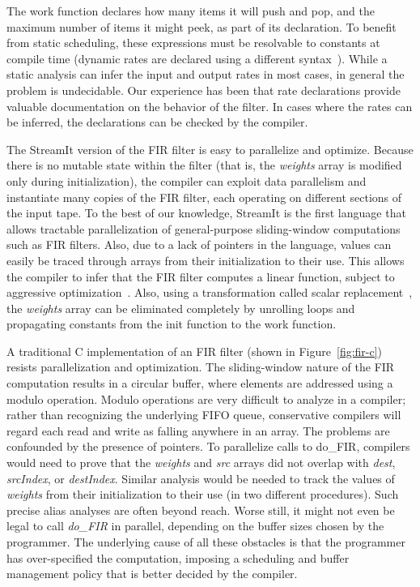 The work function declares how many items it will push and pop, and
the maximum number of items it might peek, as part of its declaration.
To benefit from static scheduling, these expressions must be
resolvable to constants at compile time (dynamic rates are declared
using a different syntax~\cite{streamit-lang-spec}). While a static
analysis can infer the input and output rates in most cases, in
general the problem is undecidable.  Our experience has been that rate
declarations provide valuable documentation on the behavior of the
filter.  In cases where the rates can be inferred, the declarations
can be checked by the compiler.

The StreamIt version of the FIR filter is easy to parallelize and
optimize.  Because there is no mutable state within the filter (that
is, the {\it weights} array is modified only during initialization),
the compiler can exploit data parallelism and instantiate many copies
of the FIR filter, each operating on different sections of the input
tape.  To the best of our knowledge, StreamIt is the first language
that allows tractable parallelization of general-purpose
sliding-window computations such as FIR filters.  Also, due to a lack
of pointers in the language, values can easily be traced through
arrays from their initialization to their use.  This allows the
compiler to infer that the FIR filter computes a linear function,
subject to aggressive optimization~\cite{lamb-pldi03}.  Also,
using a transformation called scalar
replacement~\cite{sermulins:lctes:2005}, the {\it weights} array can
be eliminated completely by unrolling loops and propagating constants
from the init function to the work function.

A traditional C implementation of an FIR filter (shown in
Figure~\ref{fig:fir-c}) resists parallelization and optimization.  The
sliding-window nature of the FIR computation results in a circular
buffer, where elements are addressed using a modulo operation.  Modulo
operations are very difficult to analyze in a compiler; rather than
recognizing the underlying FIFO queue, conservative compilers will
regard each read and write as falling anywhere in an array.  The
problems are confounded by the presence of pointers.  To parallelize
calls to do\_FIR, compilers would need to prove that the {\it weights}
and {\it src} arrays did not overlap with {\it dest}, {\it srcIndex},
or {\it destIndex}.  Similar analysis would be needed to track the
values of {\it weights} from their initialization to their use (in two
different procedures).  Such precise alias analyses are often beyond
reach.  Worse still, it might not even be legal to call {\it do\_FIR}
in parallel, depending on the buffer sizes chosen by the programmer.
The underlying cause of all these obstacles is that the programmer has
over-specified the computation, imposing a scheduling and buffer
management policy that is better decided by the compiler.

